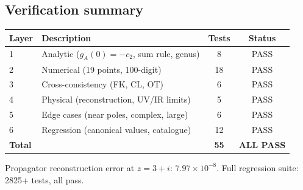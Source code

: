 \documentclass[11pt,a4paper]{article}
\begin{document}
\subsection*{Verification summary}

\begin{center}
\begin{tabular}{llcc}
  \toprule
  Layer & Description & Tests & Status \\
  \midrule
  1 & Analytic ($g_A(0) = -c_2$, sum rule, genus) & 8 & PASS \\
  2 & Numerical (19 points, 100-digit) & 18 & PASS \\
  3 & Cross-consistency (FK, CL, OT) & 6 & PASS \\
  4 & Physical (reconstruction, UV/IR limits) & 5 & PASS \\
  5 & Edge cases (near poles, complex, large) & 6 & PASS \\
  6 & Regression (canonical values, catalogue) & 12 & PASS \\
  \midrule
  \textbf{Total} & & \textbf{55} & \textbf{ALL PASS} \\
  \bottomrule
\end{tabular}
\end{center}

Propagator reconstruction error at $z = 3 + i$: $7.97 \times 10^{-8}$.
Full regression suite: 2825+ tests, all pass.
\end{document}

